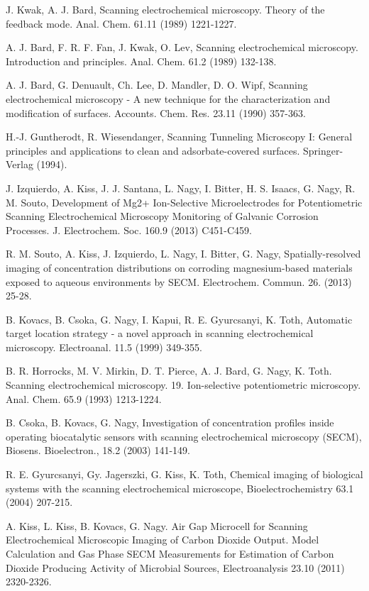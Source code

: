 \documentclass[3p]{elsarticle}
\begin{document}
\begin{thebibliography}{5}

J. Kwak, A. J. Bard, Scanning electrochemical microscopy. Theory of the feedback mode. Anal. Chem. 61.11 (1989) 1221-1227.

A. J. Bard, F. R. F. Fan, J. Kwak, O. Lev, Scanning electrochemical microscopy. Introduction and principles. Anal. Chem. 61.2 (1989) 132-138.

A. J. Bard, G. Denuault, Ch. Lee, D. Mandler, D. O. Wipf, Scanning electrochemical microscopy - A new technique for the characterization and modification of surfaces. Accounts. Chem. Res. 23.11 (1990) 357-363.

H.-J. Guntherodt, R. Wiesendanger, Scanning Tunneling Microscopy I: General principles and applications to clean and adsorbate-covered surfaces. Springer-Verlag (1994).

J. Izquierdo, A. Kiss, J. J. Santana, L. Nagy, I. Bitter, H. S. Isaacs, G. Nagy, R. M. Souto, Development of Mg2+ Ion-Selective Microelectrodes for Potentiometric Scanning Electrochemical Microscopy Monitoring of Galvanic Corrosion Processes. J. Electrochem. Soc. 160.9 (2013) C451-C459.

R. M. Souto, A. Kiss, J. Izquierdo, L. Nagy, I. Bitter, G. Nagy, Spatially-resolved imaging of concentration distributions on corroding magnesium-based materials exposed to aqueous environments by SECM. Electrochem. Commun. 26. (2013) 25-28.

B. Kovacs, B. Csoka, G. Nagy, I. Kapui, R. E. Gyurcsanyi, K. Toth, Automatic target location strategy - a novel approach in scanning electrochemical microscopy. Electroanal. 11.5 (1999) 349-355.

B. R. Horrocks, M. V. Mirkin, D. T. Pierce, A. J. Bard, G. Nagy, K. Toth. Scanning electrochemical microscopy. 19. Ion-selective potentiometric microscopy. Anal. Chem. 65.9 (1993) 1213-1224.

B. Csoka, B. Kovacs, G. Nagy, Investigation of concentration profiles inside operating biocatalytic sensors with scanning electrochemical microscopy (SECM), Biosens. Bioelectron., 18.2 (2003) 141-149.

R. E. Gyurcsanyi, Gy. Jagerszki, G. Kiss, K. Toth, Chemical imaging of biological systems with the scanning electrochemical microscope, Bioelectrochemistry 63.1 (2004) 207-215.

A. Kiss, L. Kiss, B. Kovacs, G. Nagy. Air Gap Microcell for Scanning Electrochemical Microscopic Imaging of Carbon Dioxide Output. Model Calculation and Gas Phase SECM Measurements for Estimation of Carbon Dioxide Producing Activity of Microbial Sources, Electroanalysis 23.10 (2011) 2320-2326.

\end{thebibliography}
\end{document}
